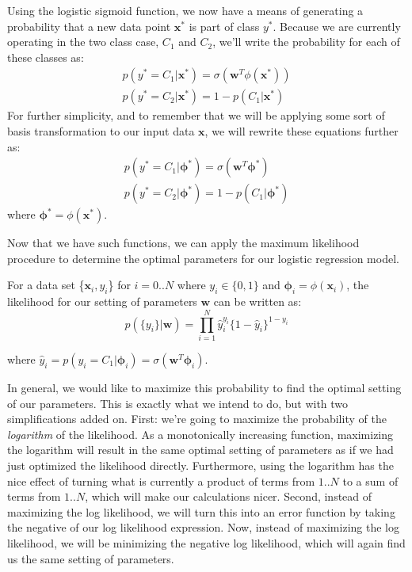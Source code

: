 
Using the logistic sigmoid function, we now have a means of generating a probability that a new data point $\textbf{x}^{*}$ is part of class $y^{*}$. Because we are currently operating in the two class case, $C_{1}$ and $C_{2}$, we'll write the probability for each of these classes as:
\begin{align*}
	p(y^{*}=C_{1}|\textbf{x}^{*}) = \sigma(\textbf{w}^{T}\phi{(\textbf{x}^{*})}) \\
	p(y^{*}=C_{2}|\textbf{x}^{*}) = 1 - p(C_{1}|\textbf{x}^{*})
\end{align*}
For further simplicity, and to remember that we will be applying some sort of basis transformation to our input data $\textbf{x}$, we will rewrite these equations further as:
\begin{align*}
	p(y^{*}=C_{1}|\boldsymbol{\phi}^{*}) = \sigma(\textbf{w}^{T}\boldsymbol{\phi}^{*}) \\
	p(y^{*}=C_{2}|\boldsymbol{\phi}^{*}) = 1 - p(C_{1}|\boldsymbol{\phi}^{*})
\end{align*}
where $\boldsymbol{\phi}^{*} = \phi{(\textbf{x}^{*})}$.

Now that we have such functions, we can apply the maximum likelihood procedure to determine the optimal parameters for our logistic regression model.

For a data set \{$\textbf{x}_{i}, y_{i}$\} for $i = 0..N$ where $y_{i} \in \{0,1\}$ and $\boldsymbol{\phi}_{i} = \phi{(\textbf{x}_{i})}$, the likelihood for our setting of parameters $\textbf{w}$ can be written as:
\begin{equation} \label{log-reg-likelihood}
	p(\{y_{i}\}|\textbf{w}) = \prod_{i=1}^{N} \hat{y}_{i}^{y_{i}} \{1 - \hat{y}_{i}\}^{1 - y_{i}}
\end{equation}

where $\hat{y}_{i} = p(y_{i}=C_{1}|\boldsymbol{\phi}_{i}) = \sigma(\textbf{w}^{T}\boldsymbol{\phi}_{i})$.

In general, we would like to maximize this probability to find the optimal setting of our parameters. This is exactly what we intend to do, but with two simplifications added on. First: we're going to maximize the probability of the \textit{logarithm} of the likelihood. As a monotonically increasing function, maximizing the logarithm will result in the same optimal setting of parameters as if we had just optimized the likelihood directly. Furthermore, using the logarithm has the nice effect of turning what is currently a product of terms from $1..N$ to a sum of terms from $1..N$, which will make our calculations nicer. Second, instead of maximizing the log likelihood, we will turn this into an error function by taking the negative of our log likelihood expression. Now, instead of maximizing the log likelihood, we will be minimizing the negative log likelihood, which will again find us the same setting of parameters.

